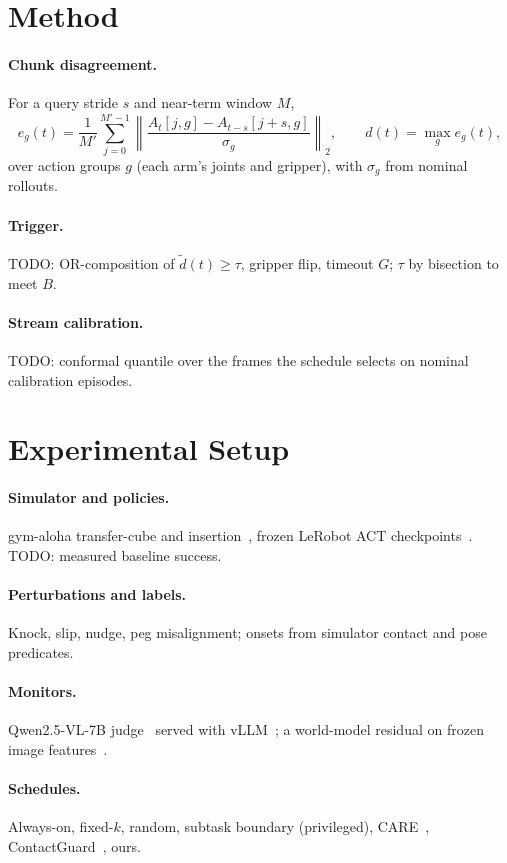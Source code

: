 \documentclass[11pt]{article}
\begin{document}
\section{Method}
\paragraph{Chunk disagreement.}
For a query stride $s$ and near-term window $M$,
\begin{equation}
e_g(t) = \frac{1}{M'}\sum_{j=0}^{M'-1} \left\| \frac{A_t[j,g] - A_{t-s}[j+s,g]}{\sigma_g} \right\|_2, \qquad d(t) = \max_g e_g(t),
\end{equation}
over action groups $g$ (each arm's joints and gripper), with $\sigma_g$ from nominal rollouts.
\paragraph{Trigger.} TODO: OR-composition of $\tilde d(t) \ge \tau$, gripper flip, timeout $G$; $\tau$ by bisection to meet $B$.
\paragraph{Stream calibration.} TODO: conformal quantile over the frames the schedule selects on nominal calibration episodes.

\section{Experimental Setup}
\paragraph{Simulator and policies.} gym-aloha transfer-cube and insertion~\citep{zhao2023act}, frozen LeRobot ACT checkpoints~\citep{cadene2024lerobot}. TODO: measured baseline success.
\paragraph{Perturbations and labels.} Knock, slip, nudge, peg misalignment; onsets from simulator contact and pose predicates.
\paragraph{Monitors.} Qwen2.5-VL-7B judge~\citep{bai2025qwen25vl} served with vLLM~\citep{kwon2023vllm}; a world-model residual on frozen image features~\citep{oquab2024dinov2,zhou2024dinowm}.
\paragraph{Schedules.} Always-on, fixed-$k$, random, subtask boundary (privileged), CARE~\citep{care2026}, ContactGuard~\citep{contactguard2026}, ours.
\end{document}

